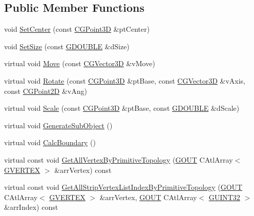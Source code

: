 \subsection*{Public Member Functions}
\begin{DoxyCompactItemize}
\item 
void \hyperlink{class_c_g_object_car_a46dbdfa554dc337f5cea68c77f754f42}{Set\+Center} (const \hyperlink{class_c_g_point3_d}{C\+G\+Point3\+D} \&pt\+Center)
\item 
void \hyperlink{class_c_g_object_car_afe7d5776c38555f7eb3cd6fe83271601}{Set\+Size} (const \hyperlink{_g_types_8h_afd05ac85f90ee8e2a733928545462cd4}{G\+D\+O\+U\+B\+L\+E} \&d\+Size)
\item 
virtual void \hyperlink{class_c_g_object_car_a9e03f5011e3fca104d121e4aebb7a809}{Move} (const \hyperlink{_g_point3_d_8h_aa7e73d39f4c991acb5a13c84b498366d}{C\+G\+Vector3\+D} \&v\+Move)
\item 
virtual void \hyperlink{class_c_g_object_car_a6ee4c95110ffd0660cca87742fa8dd04}{Rotate} (const \hyperlink{class_c_g_point3_d}{C\+G\+Point3\+D} \&pt\+Base, const \hyperlink{_g_point3_d_8h_aa7e73d39f4c991acb5a13c84b498366d}{C\+G\+Vector3\+D} \&v\+Axis, const \hyperlink{class_c_g_point2_d}{C\+G\+Point2\+D} \&v\+Ang)
\item 
virtual void \hyperlink{class_c_g_object_car_ad5d2f8e40639980b387052f72432f9ba}{Scale} (const \hyperlink{class_c_g_point3_d}{C\+G\+Point3\+D} \&pt\+Base, const \hyperlink{_g_types_8h_afd05ac85f90ee8e2a733928545462cd4}{G\+D\+O\+U\+B\+L\+E} \&d\+Scale)
\item 
virtual void \hyperlink{class_c_g_object_car_a33da025a1da670418155b76ea404db18}{Generate\+Sub\+Object} ()
\item 
virtual void \hyperlink{class_c_g_object_car_ae99f60f59ab900c29bf935612c71b50e}{Calc\+Boundary} ()
\item 
virtual const void \hyperlink{class_c_g_object_car_ac7cbddc21dc5a4930472736eb3d642c4}{Get\+All\+Vertex\+By\+Primitive\+Topology} (\hyperlink{_g_types_8h_a0858ec221262e635612871d70ca233ad}{G\+O\+U\+T} C\+Atl\+Array$<$ \hyperlink{struct_g_v_e_r_t_e_x}{G\+V\+E\+R\+T\+E\+X} $>$ \&arr\+Vertex) const 
\item 
virtual const void \hyperlink{class_c_g_object_car_adbb0be55b530aaf8e25f809929ffbf0e}{Get\+All\+Strip\+Vertex\+List\+Index\+By\+Primitive\+Topology} (\hyperlink{_g_types_8h_a0858ec221262e635612871d70ca233ad}{G\+O\+U\+T} C\+Atl\+Array$<$ \hyperlink{struct_g_v_e_r_t_e_x}{G\+V\+E\+R\+T\+E\+X} $>$ \&arr\+Vertex, \hyperlink{_g_types_8h_a0858ec221262e635612871d70ca233ad}{G\+O\+U\+T} C\+Atl\+Array$<$ \hyperlink{_g_types_8h_a2e1a1c77d1349057202e2f34e071019c}{G\+U\+I\+N\+T32} $>$ \&arr\+Index) const 

\end{DoxyCompactItemize}
